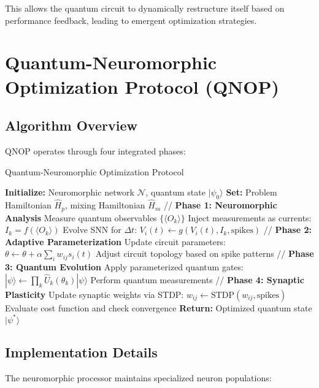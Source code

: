 \documentclass[arxiv,final,oneside,onecolumn]{arxiv-preprint-simple}
\newcommand{\qstate}[1]{|#1\rangle}
\newcommand{\qexpect}[1]{\langle#1\rangle}
\newcommand{\qgate}[1]{\hat{#1}}
\newcommand{\spike}[1]{s_{#1}(t)}
\newcommand{\membrane}[1]{V_{#1}(t)}
\newcommand{\weight}[2]{w_{#1#2}}
\begin{document}
This allows the quantum circuit to dynamically restructure itself based on performance feedback, leading to emergent optimization strategies.

\section{Quantum-Neuromorphic Optimization Protocol (QNOP)}

\subsection{Algorithm Overview}

QNOP operates through four integrated phases:

\begin{algorithm}[H]
\caption{Quantum-Neuromorphic Optimization Protocol}
\label{alg:qnop}
\begin{algorithmic}[1]
\State \textbf{Initialize:} Neuromorphic network $\mathcal{N}$, quantum state $\qstate{\psi_0}$
\State \textbf{Set:} Problem Hamiltonian $\qgate{H}_p$, mixing Hamiltonian $\qgate{H}_m$
    \State // \textbf{Phase 1: Neuromorphic Analysis}
    \State Measure quantum observables $\{\qexpect{O_k}\}$
    \State Inject measurements as currents: $I_k = f(\qexpect{O_k})$
    \State Evolve SNN for $\Delta t$: $\membrane{i} \leftarrow g(\membrane{i}, I_k, \text{spikes})$
    \State // \textbf{Phase 2: Adaptive Parameterization}  
    \State Update circuit parameters: $\theta \leftarrow \theta + \alpha \sum_i \weight{i}{j} \spike{i}$
    \State Adjust circuit topology based on spike patterns
    \State // \textbf{Phase 3: Quantum Evolution}
    \State Apply parameterized quantum gates: $\qstate{\psi} \leftarrow \prod_k \qgate{U}_k(\theta_k)\qstate{\psi}$
    \State Perform quantum measurements
    \State // \textbf{Phase 4: Synaptic Plasticity}
    \State Update synaptic weights via STDP: $\weight{i}{j} \leftarrow \text{STDP}(\weight{i}{j}, \text{spikes})$
    \State Evaluate cost function and check convergence
\EndWhile
\State \textbf{Return:} Optimized quantum state $\qstate{\psi^*}$
\end{algorithmic}
\end{algorithm}

\subsection{Implementation Details}

The neuromorphic processor maintains specialized neuron populations:
\end{document}
